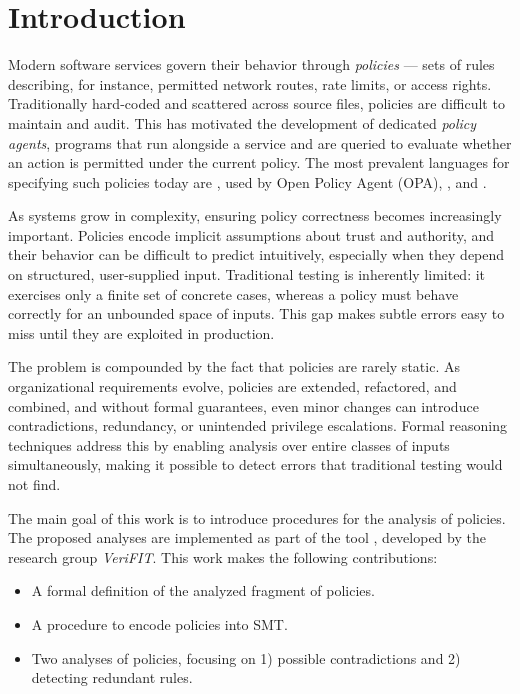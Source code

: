 \chapter{Introduction}
\label{ch:intro}

Modern software services govern their behavior through \emph{policies} — sets of rules describing, for instance, permitted network routes, rate limits, or access rights. Traditionally hard-coded and scattered across source files, policies are difficult to maintain and audit. This has motivated the development of dedicated \emph{policy agents}, programs that run alongside a service and are queried to evaluate whether an action is permitted under the current policy. The most prevalent languages for specifying such policies today are \rego, used by Open Policy Agent (OPA), \cedar, and \openfga.

As systems grow in complexity, ensuring policy correctness becomes increasingly important. Policies encode implicit assumptions about trust and authority, and their behavior can be difficult to predict intuitively, especially when they depend on structured, user-supplied input. Traditional testing is inherently limited: it exercises only a finite set of concrete cases, whereas a policy must behave correctly for an unbounded space of inputs. This gap makes subtle errors easy to miss until they are exploited in production.

The problem is compounded by the fact that policies are rarely static. As organizational requirements evolve, policies are extended, refactored, and combined, and without formal guarantees, even minor changes can introduce contradictions, redundancy, or unintended privilege escalations. Formal reasoning techniques address this by enabling analysis over entire classes of inputs simultaneously, making it possible to detect errors that traditional testing would not find.

The main goal of this work is to introduce procedures for the analysis of \rego policies. The proposed analyses are implemented as part of the tool \verirego, developed by the research group \emph{VeriFIT}. This work makes the following contributions:
\begin{itemize}
  \item A formal definition of the analyzed fragment of \rego policies.
  \item A procedure to encode \rego policies into SMT.
  \item Two analyses of \rego policies, focusing on 1) possible contradictions and 2) detecting redundant rules.
\end{itemize}

